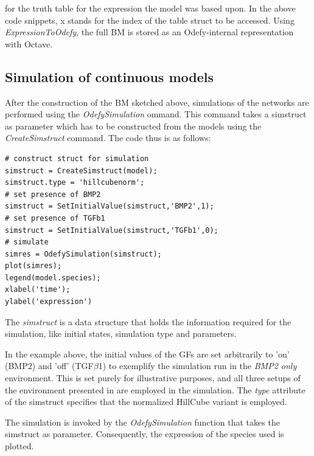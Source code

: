 \documentclass[11pt]{article}
\begin{document}
for the truth table for the expression the model was based upon. In the above code snippets, x stands for the index of the table struct to be accessed. Using \textit{ExpressionToOdefy}, the full BM is stored as an Odefy-internal representation with Octave.

\subsection{Simulation of continuous models} \label{ssec:simulationCM}
After the construction of the BM sketched above, simulations of the networks are performed using the \textit{OdefySimulation} ommand. This command takes a simstruct as parameter which has to be constructed from the models using the \textit{CreateSimstruct} command. The code thus is as follows:
\begin{lstlisting}
# construct struct for simulation
simstruct = CreateSimstruct(model);
simstruct.type = 'hillcubenorm';
# set presence of BMP2
simstruct = SetInitialValue(simstruct,'BMP2',1);
# set presence of TGFb1
simstruct = SetInitialValue(simstruct,'TGFb1',0);
# simulate
simres = OdefySimulation(simstruct);
plot(simres);
legend(model.species);
xlabel('time');
ylabel('expression')
\end{lstlisting}

The \textit{simstruct} is a data structure that holds the information required for the simulation, like initial states, simulation type and parameters.

In the example above, the initial values of the GFs are set arbitrarily to 'on' (BMP2) and 'off' (TGF$\beta$1) to exemplify the simulation run in the \textit{BMP2 only} environment. This is set purely for illustrative purposes, and all three
setups of the environment presented in \cite{Kirkham} are employed in the simulation. The \textit{type} attribute of the simstruct specifies that the normalized HillCube variant is employed.

The simulation is invoked by the \textit{OdefySimulation} function that takes the simstruct as parameter. Consequently, the expression of the species used is plotted.

{}

\end{document}
